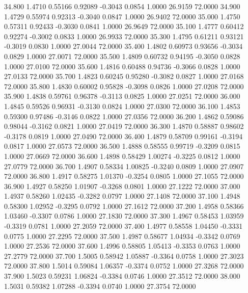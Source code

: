   34.800   1.4710   0.55166   0.92089  -0.3043   0.0854   1.0000  26.9159  72.0000
  34.900   1.4729   0.55974   0.92313  -0.3040   0.0847   1.0000  26.9402  72.0000
  35.000   1.4750   0.57311   0.92433  -0.3030   0.0841   1.0000  26.9649  72.0000
  35.100   1.4777   0.60412   0.92274  -0.3002   0.0833   1.0000  26.9933  72.0000
  35.300   1.4795   0.61211   0.93121  -0.3019   0.0830   1.0000  27.0044  72.0000
  35.400   1.4802   0.60973   0.93656  -0.3034   0.0829   1.0000  27.0071  72.0000
  35.500   1.4809   0.60732   0.94195  -0.3050   0.0828   1.0000  27.0100  72.0000
  35.600   1.4816   0.60488   0.94736  -0.3066   0.0828   1.0000  27.0133  72.0000
  35.700   1.4823   0.60245   0.95280  -0.3082   0.0827   1.0000  27.0168  72.0000
  35.800   1.4830   0.60002   0.95828  -0.3098   0.0826   1.0000  27.0208  72.0000
  35.900   1.4838   0.59761   0.96378  -0.3113   0.0825   1.0000  27.0251  72.0000
  36.000   1.4845   0.59526   0.96931  -0.3130   0.0824   1.0000  27.0300  72.0000
  36.100   1.4853   0.59300   0.97486  -0.3146   0.0822   1.0000  27.0356  72.0000
  36.200   1.4862   0.59086   0.98044  -0.3162   0.0821   1.0000  27.0419  72.0000
  36.300   1.4870   0.58887   0.98602  -0.3178   0.0819   1.0000  27.0490  72.0000
  36.400   1.4879   0.58709   0.99161  -0.3194   0.0817   1.0000  27.0573  72.0000
  36.500   1.4888   0.58555   0.99719  -0.3209   0.0815   1.0000  27.0669  72.0000
  36.600   1.4898   0.58429   1.00274  -0.3225   0.0812   1.0000  27.0779  72.0000
  36.700   1.4907   0.58334   1.00825  -0.3240   0.0809   1.0000  27.0907  72.0000
  36.800   1.4917   0.58275   1.01370  -0.3254   0.0805   1.0000  27.1055  72.0000
  36.900   1.4927   0.58250   1.01907  -0.3268   0.0801   1.0000  27.1222  72.0000
  37.000   1.4937   0.58260   1.02435  -0.3282   0.0797   1.0000  27.1408  72.0000
  37.100   1.4948   0.58300   1.02952  -0.3295   0.0792   1.0000  27.1612  72.0000
  37.200   1.4958   0.58366   1.03460  -0.3307   0.0786   1.0000  27.1830  72.0000
  37.300   1.4967   0.58453   1.03959  -0.3319   0.0781   1.0000  27.2059  72.0000
  37.400   1.4977   0.58558   1.04450  -0.3331   0.0775   1.0000  27.2295  72.0000
  37.500   1.4987   0.58677   1.04934  -0.3342   0.0769   1.0000  27.2536  72.0000
  37.600   1.4996   0.58805   1.05413  -0.3353   0.0763   1.0000  27.2779  72.0000
  37.700   1.5005   0.58942   1.05887  -0.3364   0.0758   1.0000  27.3023  72.0000
  37.800   1.5014   0.59084   1.06357  -0.3374   0.0752   1.0000  27.3268  72.0000
  37.900   1.5023   0.59231   1.06824  -0.3384   0.0746   1.0000  27.3512  72.0000
  38.000   1.5031   0.59382   1.07288  -0.3394   0.0740   1.0000  27.3754  72.0000
